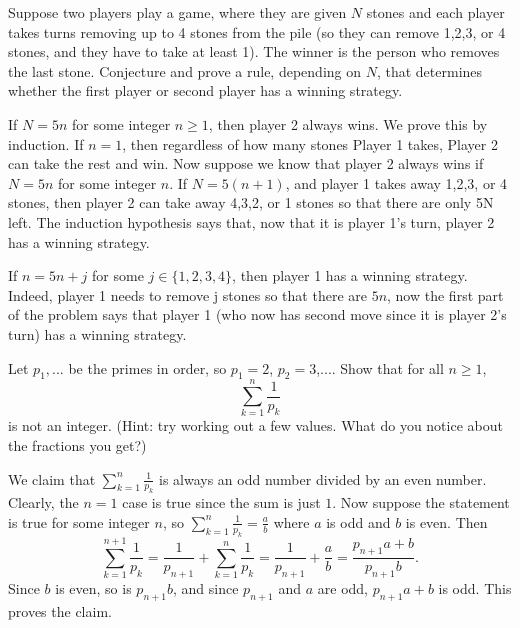 \documentclass[11pt,dvipsnames]{book}
\numberwithin{equation}{section} %
\numberwithin{figure}{section} %
\numberwithin{table}{section} %
\begin{document}
\begin{exercise}
Suppose two players play a game, where they are given $N$ stones and each player takes turns removing up to 4 stones from the pile (so they can remove 1,2,3, or 4 stones, and they have to take at least 1). The winner is the person who removes the last stone. Conjecture and prove a rule, depending on $N$, that determines whether the first player or second player has a winning strategy.
\end{exercise}

\begin{solution}
If $N=5n$ for some integer $n\geq 1$, then player 2 always wins. We prove this by induction. If $n=1$, then regardless of how many stones Player 1 takes, Player 2 can take the rest and win. Now suppose we know that player 2 always wins if $N=5n$ for some integer $n$. If $N=5(n+1)$, and player 1 takes away 1,2,3, or 4 stones, then player 2 can take away 4,3,2, or 1 stones so that there are only 5N left. The induction hypothesis says that, now that it is player 1's turn, player 2 has a winning strategy. 

If $n=5n+j$ for some $j\in \{1,2,3,4\}$, then player 1 has a winning strategy. Indeed, player 1 needs to remove j stones so that there are $5n$, now the first part of the problem says that player 1 (who now has second move since it is player 2's turn) has a winning strategy. 

\end{solution}


\begin{exercise}
Let $p_{1},...$ be the primes in order, so $p_1=2$, $p_2=3$,.... Show that for all $n\geq 1$,
\[
\sum_{k=1}^{n}\frac{1}{p_{k}}
\]
is not an integer. (Hint: try working out a few values. What do you notice about the fractions you get?)
\end{exercise}

\begin{solution}
We claim that $\sum_{k=1}^{n}\frac{1}{p_{k}}$ is always an odd number divided by an even number. Clearly, the $n=1$ case is true since the sum is just $1$. Now suppose the statement is true for some integer $n$, so $\sum_{k=1}^{n}\frac{1}{p_{k}}=\frac{a}{b}$ where $a$ is odd and $b$ is even. Then
\[
\sum_{k=1}^{n+1}\frac{1}{p_{k}} = \frac{1}{p_{n+1}} +\sum_{k=1}^{n}\frac{1}{p_{k}} = \frac{1}{p_{n+1}}+\frac{a}{b} = \frac{p_{n+1}a+b}{p_{n+1}b}.
\]
Since $b$ is even, so is $p_{n+1}b$, and since $p_{n+1}$ and $a$ are odd, $p_{n+1}a+b$ is odd. This proves the claim. 
\end{solution}
\end{document}
